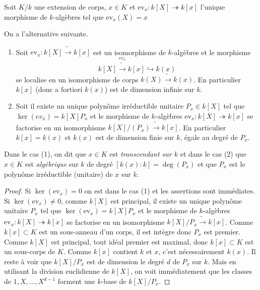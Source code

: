 Soit $K/k$ une extension de corps, $x\in K$ et
$\mathrm{ev}_x:k[X]\twoheadrightarrow k[x]$ l'unique morphisme de
$k$-algèbres tel que $\mathrm{ev}_x(X)=x$\\


\begin{lemme}
  On a l'alternative suivante.
  \begin{enumerate}[leftmargin=* ,parsep=0cm,itemsep=0cm,topsep=0cm]
  \item Soit $\mathrm{ev}_x:k[X]\tilde{\longrightarrow} k[x]$ est un
    isomorphisme de $k$-algèbres et le morphisme
    $$k[X]\stackrel{ev_x}{\tilde{\longrightarrow}}k[x]\hookrightarrow
    k(x)$$ se localise en un isomorphisme de corps
    $k(X)\tilde{\longrightarrow} k(x)$. En particulier $k[x]$ (donc a
    fortiori $k(x)$) est de dimension infinie sur $k$.
  \item Soit il existe un unique polynôme irréductible unitaire
    $P_x\in k[X]$ tel que $\ker(ev_x)=k[X]P_x$ et le morphisme de
    $k$-algèbres $\mathrm{ev}_x:k[X]\twoheadrightarrow k[x]$ se
    factorise en un isomorphisme
    $k[X]/(P_x)\tilde{\longrightarrow} k[x]$. En particulier
    $k[x]=k(x)$ et $k(x)$ est de dimension finie sur $k$, égale au
    degré de $P_x$.\\
  \end{enumerate}
\end{lemme}

\begin{definition}
  Dans le cas (1), on dit que $x\in K$ est \textit{transcendant sur $k$} et dans le cas (2) que $x\in K$ est \textit{algébrique} sur $k$ de degré $[k(x):k]=\deg(P_x)$ et que $P_x$ est le polynôme irréductible (unitaire) de $x$ sur $k$.\\
\end{definition}

\begin{proof}
  Si $\ker(\mathrm{ev}_x)=0$ on est dans le cas (1) et les assertions
  sont immédiates.\\
  Si  $\ker(\mathrm{ev}_x)\neq 0$, comme $k[X]$ est principal, il existe un unique polynôme unitaire $P_x$ tel que $\ker(\mathrm{ev}_x)=k[X]P_x$ et  le morphisme de $k$-algèbres $\mathrm{ev}_x:k[X]\twoheadrightarrow k[x]$ se factorise en un isomorphisme $k[X]/P_x\tilde{\rightarrow} k[x]$. Comme $k[x]\subset K$ est un sous-anneau d'un corps, il est intègre donc  $P_x$ est premier. Comme $k[X]$ est principal, tout idéal premier est maximal, donc $k[x]\subset K$ est un sous-corps de $K$. Comme $k[x]$ contient  $k$ et $x$, c'est nécessairement $k(x)$. Il reste à voir que $k[X]/P_x $ est de dimension le degré $d$ de $P_x$ sur $k$. Mais en utilisant la division euclidienne de   $k[X]$, on voit immédiatement que les classes de  $1,X,\dots, X^{d-1}$ forment une $k$-base de $k[X]/P_x$.
\end{proof}

